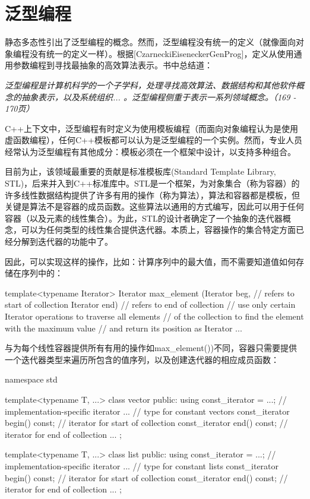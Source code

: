 \section{泛型编程}
静态多态性引出了泛型编程的概念。然而，泛型编程没有统一的定义（就像面向对象编程没有统一的定义一样）。根据[CzarneckiEiseneckerGenProg]，定义从使用通用参数编程到寻找最抽象的高效算法表示。书中总结道：

\textit{泛型编程是计算机科学的一个子学科，处理寻找高效算法、数据结构和其他软件概念的抽象表示，以及系统组织... 。泛型编程侧重于表示一系列领域概念。（169 - 170页）}

C++上下文中，泛型编程有时定义为使用模板编程（而面向对象编程认为是使用虚函数编程），任何C++模板都可以认为是泛型编程的一个实例。然而，专业人员经常认为泛型编程有其他成分：模板必须在一个框架中设计，以支持多种组合。

目前为止，该领域最重要的贡献是标准模板库(Standard Template Library, STL)，后来并入到C++标准库中。STL是一个框架，为对象集合（称为容器）的许多线性数据结构提供了许多有用的操作（称为算法），算法和容器都是模板，但关键是算法不是容器的成员函数。这些算法以通用的方式编写，因此可以用于任何容器（以及元素的线性集合）。为此，STL的设计者确定了一个抽象的迭代器概念，可以为任何类型的线性集合提供迭代器。本质上，容器操作的集合特定方面已经分解到迭代器的功能中了。

因此，可以实现这样的操作，比如：计算序列中的最大值，而不需要知道值如何存储在序列中的：

\begin{cpp}
template<typename Iterator>
Iterator max_element (Iterator beg, // refers to start of collection
					  Iterator end) // refers to end of collection
{
	// use only certain Iterator operations to traverse all elements
	// of the collection to find the element with the maximum value
	// and return its position as Iterator
	...
}
\end{cpp}

与为每个线性容器提供所有有用的操作如max\_element())不同，容器只需要提供一个迭代器类型来遍历所包含的值序列，以及创建迭代器的相应成员函数：

\begin{cpp}
namespace std {
	template<typename T, ...>
	class vector {
		public:
		using const_iterator = ...; // implementation-specific iterator
		... // type for constant vectors
		const_iterator begin() const; // iterator for start of collection
		const_iterator end() const; // iterator for end of collection
		...
	};

	template<typename T, ...>
	class list {
		public:
		using const_iterator = ...; // implementation-specific iterator
		... // type for constant lists
		const_iterator begin() const; // iterator for start of collection
		const_iterator end() const; // iterator for end of collection
		...
	};
}
\end{cpp}

